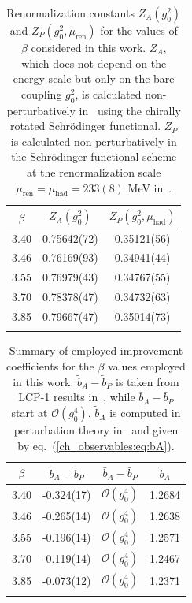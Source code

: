 \begin{longtable}{c c c}
    \label{ch_observables:tab:Z}
    $\beta$ & $Z_A(g_0^2)$ & $Z_P(g_0^2,\mu_{\textrm{had}})$ \\
    \toprule
    3.40 & 0.75642(72) & 0.35121(56) \\
    3.46 & 0.76169(93) & 0.34941(44) \\
    3.55 & 0.76979(43) & 0.34767(55) \\
    3.70 & 0.78378(47) & 0.34732(63) \\
    3.85 & 0.79667(47) & 0.35014(73) \\
    \bottomrule
    \caption{Renormalization constants $Z_A(g_0^2)$ and $Z_P(g_0^2,\mu_{\textrm{ren}})$ for the values of $\beta$ considered in this work. $Z_A$, which does not depend on the energy scale but only on the bare coupling $g_0^2$, is calculated non-perturbatively in~\citep{DallaBrida:2018tpn} using the chirally rotated Schrödinger functional. $Z_P$ is calculated non-perturbatively in the Schrödinger functional scheme at the renormalization scale $\mu_{\textrm{ren}}=\mu_{\textrm{had}}=233(8)$ MeV in~\citep{Campos:2018ahf}.}
\end{longtable}

\begin{longtable}{c c c c}
    \label{ch_observables:tab:b}
    $\beta$ & $\tilde{b}_A-\tilde{b}_P$ & $\bar{b}_A-\bar{b}_P$ & $\tilde{b}_A$ \\
    \toprule
    3.40 & -0.324(17) & $\mathcal{O}(g_0^4)$ & 1.2684 \\
    3.46 & -0.265(14) & $\mathcal{O}(g_0^4)$ & 1.2638 \\
    3.55 & -0.196(14) & $\mathcal{O}(g_0^4)$ & 1.2571 \\
    3.70 & -0.119(14) & $\mathcal{O}(g_0^4)$ & 1.2467 \\
    3.85 & -0.073(12) & $\mathcal{O}(g_0^4)$ & 1.2371 \\
    \bottomrule
    \caption{Summary of employed improvement coefficients for the $\beta$ values employed in this work. $\tilde{b}_A-\tilde{b}_P$ is taken from LCP-1 results in~\citep{deDivitiis:2017vvw}, while $\bar{b}_A-\bar{b}_P$ start at $\mathcal{O}(g_0^4)$. $\tilde{b}_A$ is computed in perturbation theory in~\citep{Taniguchi:1998pf} and given by eq.~(\ref{ch_observables:eq:bA}).}
\end{longtable}

